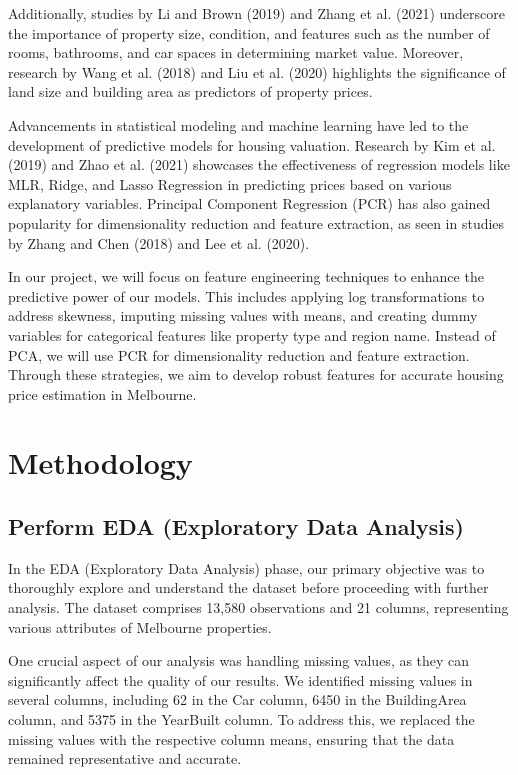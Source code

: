 \documentclass[12pt,doublespace]{article}
\begin{document}
	Additionally, studies by Li and Brown (2019) and Zhang et al. (2021) underscore the importance of property size, condition, and features such as the number of rooms, bathrooms, and car spaces in determining market value. Moreover, research by Wang et al. (2018) and Liu et al. (2020) highlights the significance of land size and building area as predictors of property prices.
	
	Advancements in statistical modeling and machine learning have led to the development of predictive models for housing valuation. Research by Kim et al. (2019) and Zhao et al. (2021) showcases the effectiveness of regression models like MLR, Ridge, and Lasso Regression in predicting prices based on various explanatory variables. Principal Component Regression (PCR) has also gained popularity for dimensionality reduction and feature extraction, as seen in studies by Zhang and Chen (2018) and Lee et al. (2020).
	
	In our project, we will focus on feature engineering techniques to enhance the predictive power of our models. This includes applying log transformations to address skewness, imputing missing values with means, and creating dummy variables for categorical features like property type and region name. Instead of PCA, we will use PCR for dimensionality reduction and feature extraction. Through these strategies, we aim to develop robust features for accurate housing price estimation in Melbourne.
	
	\section {Methodology}
	\subsection{Perform EDA (Exploratory Data Analysis)}
	In the EDA (Exploratory Data Analysis) phase, our primary objective was to thoroughly explore and understand the dataset before proceeding with further analysis. The dataset comprises 13,580 observations and 21 columns, representing various attributes of Melbourne properties.
	
	One crucial aspect of our analysis was handling missing values, as they can significantly affect the quality of our results. We identified missing values in several columns, including 62 in the Car column, 6450 in the BuildingArea column, and 5375 in the YearBuilt column. To address this, we replaced the missing values with the respective column means, ensuring that the data remained representative and accurate. 	
	
\end{document}
